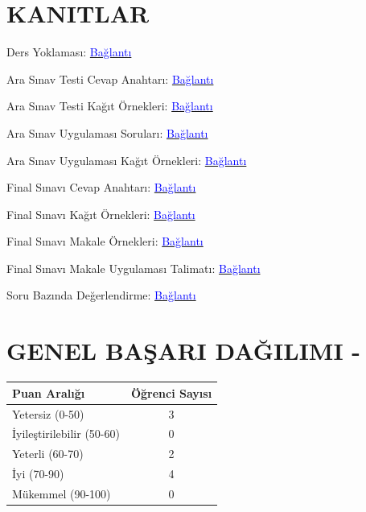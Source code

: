\documentclass[12pt,a4paper]{article}
\begin{document}
\vspace{0.5cm}
\section*{KANITLAR}


Ders Yoklaması:
\href{https://drive.google.com/file/d/1JeWkTLrxBbapeqZN4V_5nImaD7P2ZT2o/view?usp=drive_link}{\textcolor{blue}{Bağlantı}}

Ara Sınav Testi Cevap Anahtarı:
\href{https://drive.google.com/file/d/1wryUOlLb1pAxRwuXdkXKkpBwq-U3oRWJ/view?usp=drive_link}{\textcolor{blue}{Bağlantı}}

Ara Sınav Testi Kağıt Örnekleri:
\href{https://drive.google.com/file/d/1Md2AtZUSq5-wmGOvaASg_6iBitBnzvSu/view?usp=drive_link}{\textcolor{blue}{Bağlantı}}

Ara Sınav Uygulaması Soruları: \href{https://drive.google.com/file/d/1FDyqROkKCLLRm0p6D_WqMCWiMfASUdQx/view?usp=drive_link}{\textcolor{blue}{Bağlantı}}

Ara Sınav Uygulaması Kağıt Örnekleri: \href{https://drive.google.com/file/d/17zi-N6Sfi5DiU6HYQIzmvm-ziamIi86Z/view?usp=drive_link}{\textcolor{blue}{Bağlantı}}

Final Sınavı Cevap Anahtarı: \href{https://drive.google.com/file/d/1RFGc3xPn5SkQCeCQCFbMg2bqLOYANbe0/view?usp=drive_link}{\textcolor{blue}{Bağlantı}}

Final Sınavı Kağıt Örnekleri: \href{https://drive.google.com/file/d/1rPvuzNIJ1FhTq5pxhZo3JQIjdApXDQ9l/view?usp=drive_link}{\textcolor{blue}{Bağlantı}}

Final Sınavı Makale Örnekleri:
\href{https://drive.google.com/file/d/1u5lXlTA9xKJkStcwZ4nQS5OjRsSQxG5T/view?usp=drive_link}{\textcolor{blue}{Bağlantı}}

Final Sınavı Makale Uygulaması Talimatı:
\href{https://drive.google.com/file/d/1OvXfg7KxzEaIX74-8DyeFA1QUzcA-cOr/view?usp=drive_link}{\textcolor{blue}{Bağlantı}}


Soru Bazında Değerlendirme: \href{https://docs.google.com/spreadsheets/d/1J53BQqH7wkT1fnFdQ8SDLvdW3WlpDUPC/edit?usp=drive_link&ouid=113525961747692217101&rtpof=true&sd=true}{\textcolor{blue}{Bağlantı}}

\vspace{0.5cm}
\section*{GENEL BAŞARI DAĞILIMI - }
\begin{center}
\begin{tabular}{lc}
\toprule
\textbf{Puan Aralığı} & \textbf{Öğrenci Sayısı} \\
\midrule
Yetersiz (0-50) & 3 \\
İyileştirilebilir (50-60) & 0 \\
Yeterli (60-70) & 2 \\
İyi (70-90) & 4 \\
Mükemmel (90-100) & 0 \\
\bottomrule
\end{tabular}
\end{center}
\end{document}
